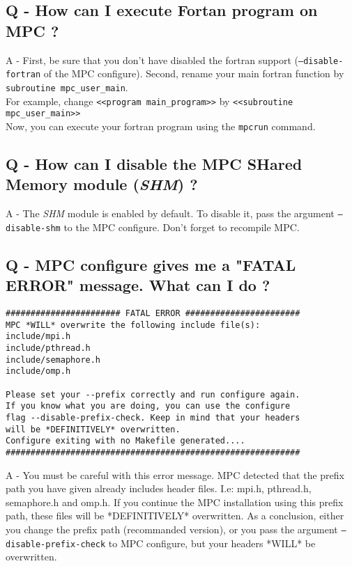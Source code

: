 \documentclass[a4paper,11pt]{article}
\begin{document}
\subsection*{Q - How can I execute Fortan program on MPC ?}
A - First, be sure that you don't have disabled the fortran support (\texttt{--disable-fortran} of the MPC configure).
Second, rename your main fortran function by {\tt subroutine mpc\_user\_main}.\\
For example, change {\tt{\textless}{\textless}program main\_program{\textgreater}{\textgreater}} by {\tt{\textless}{\textless}subroutine mpc\_user\_main{\textgreater}{\textgreater}}\\
Now, you can execute your fortran program using the \texttt{mpcrun} command.

\subsection*{Q - How can I disable the MPC SHared Memory module (\emph{SHM}) ?}
A - The \emph{SHM} module is enabled by default. To disable it, pass the argument {\tt--disable-shm} to the MPC configure. Don't forget to recompile MPC.

\subsection*{Q - MPC configure gives me a "FATAL ERROR" message. What can I do ?}
\begin{verbatim}
####################### FATAL ERROR #######################
MPC *WILL* overwrite the following include file(s):
include/mpi.h
include/pthread.h
include/semaphore.h
include/omp.h

Please set your --prefix correctly and run configure again.
If you know what you are doing, you can use the configure
flag --disable-prefix-check. Keep in mind that your headers
will be *DEFINITIVELY* overwritten.
Configure exiting with no Makefile generated....
###########################################################
\end{verbatim}
A - You must be careful with this error message. MPC detected that the prefix path you have given already includes header files. I.e: mpi.h, pthread.h, semaphore.h and omp.h.
If you continue the MPC installation using this prefix path, these files will be *DEFINITIVELY* overwritten.
As a conclusion, either you change the prefix path (recommanded version), or you pass the argument {\tt --disable-prefix-check} to MPC configure, but your headers *WILL* be overwritten.
\end{document}
